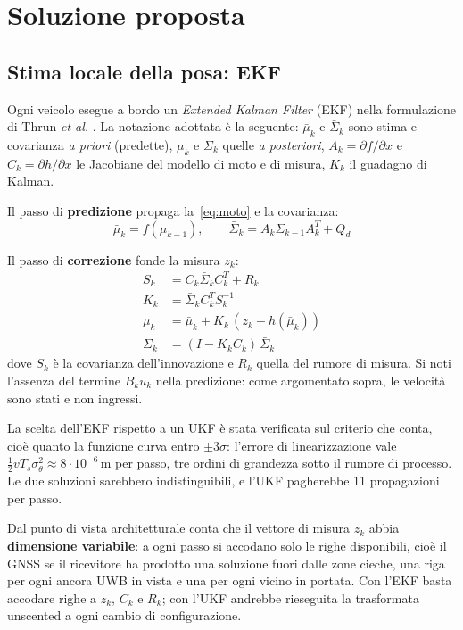 \documentclass[conference,9pt]{IEEEtran}
\begin{document}
\section{Soluzione proposta}
\label{sec:soluzione}

\subsection{Stima locale della posa: EKF}

Ogni veicolo esegue a bordo un \emph{Extended Kalman Filter} (EKF) nella
formulazione di Thrun \emph{et al.} \cite{thrun2005}. La notazione adottata
\`e la seguente: $\bar\mu_k$ e $\bar\Sigma_k$ sono stima e covarianza
\emph{a priori} (predette), $\mu_k$ e $\Sigma_k$ quelle \emph{a posteriori},
$A_k = \partial f/\partial x$ e $C_k = \partial h/\partial x$ le Jacobiane del
modello di moto e di misura, $K_k$ il guadagno di Kalman.

Il passo di \textbf{predizione} propaga la~\eqref{eq:moto} e la covarianza:
\begin{equation}
\bar\mu_k = f(\mu_{k-1}), \qquad
\bar\Sigma_k = A_k \Sigma_{k-1} A_k^T + Q_d
\end{equation}

Il passo di \textbf{correzione} fonde la misura $z_k$:
\begin{align}
S_k &= C_k \bar\Sigma_k C_k^T + R_k\\
K_k &= \bar\Sigma_k C_k^T S_k^{-1}\\
\mu_k &= \bar\mu_k + K_k\,(z_k - h(\bar\mu_k))\\
\Sigma_k &= (I - K_k C_k)\,\bar\Sigma_k
\end{align}
dove $S_k$ \`e la covarianza dell'innovazione e $R_k$ quella del rumore di
misura. Si noti l'assenza del termine $B_k u_k$ nella predizione: come
argomentato sopra, le velocit\`a sono stati e non ingressi.

La scelta dell'EKF rispetto a un UKF \`e stata verificata sul criterio che
conta, cio\`e quanto la funzione curva entro $\pm 3\sigma$: l'errore di
linearizzazione vale $\tfrac{1}{2}v T_s \sigma_\theta^2 \approx 8\cdot10^{-6}$\,m
per passo, tre ordini di grandezza sotto il rumore di processo. Le due soluzioni
sarebbero indistinguibili, e l'UKF pagherebbe 11 propagazioni per passo.

Dal punto di vista architetturale conta che il vettore di misura $z_k$ abbia
\textbf{dimensione variabile}: a ogni passo si accodano solo le righe
disponibili, cio\`e il GNSS se il ricevitore ha prodotto una soluzione fuori
dalle zone cieche, una riga per ogni ancora UWB in vista e una per ogni vicino
in portata. Con l'EKF basta accodare righe a $z_k$, $C_k$ e $R_k$; con l'UKF
andrebbe rieseguita la trasformata unscented a ogni cambio di configurazione.
\end{document}
